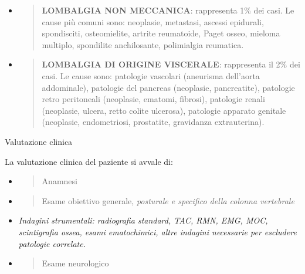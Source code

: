 \documentclass[]{article}
\begin{document}
\begin{itemize}
\item
  \begin{quote}
  \textbf{LOMBALGIA NON MECCANICA}: rappresenta 1\% dei casi. Le cause
  più comuni sono: neoplasie, metastasi, ascessi epidurali, spondisciti,
  osteomielite, artrite reumatoide, Paget osseo, mieloma multiplo,
  spondilite anchilosante, polimialgia reumatica.
  \end{quote}
\end{itemize}

\begin{itemize}
\item
  \begin{quote}
  \textbf{LOMBALGIA DI ORIGINE VISCERALE}: rappresenta il 2\% dei casi.
  Le cause sono: patologie vascolari (aneurisma dell'aorta addominale),
  patologie del pancreas (neoplasie, pancreatite), patologie retro
  peritoneali (neoplasie, ematomi, fibrosi), patologie renali
  (neoplasie, ulcera, retto colite ulcerosa), patologie apparato
  genitale (neoplasie, endometriosi, prostatite, gravidanza
  extrauterina).
  \end{quote}
\end{itemize}

Valutazione clinica

La valutazione clinica del paziente si avvale di:

\begin{itemize}
\item
  \begin{quote}
  Anamnesi
  \end{quote}
\end{itemize}

\begin{itemize}
\item
  \begin{quote}
  Esame obiettivo generale, \emph{posturale e specifico della colonna
  vertebrale}
  \end{quote}
\end{itemize}

\begin{itemize}
\item
  \emph{Indagini strumentali: radiografia standard, TAC, RMN, EMG, MOC,
  scintigrafia ossea, esami ematochimici, altre indagini necessarie per
  escludere patologie correlate. }
\end{itemize}

\begin{itemize}
\item
  \begin{quote}
  Esame neurologico
  \end{quote}
\end{itemize}
\end{document}
